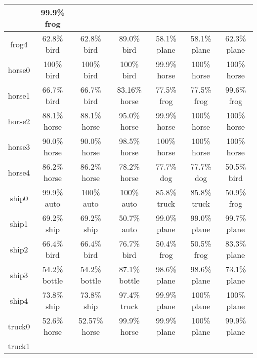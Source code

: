 \begin{longtable}{| c | c | c | c | c | c | c |}
& 99.9\% frog\cellcolor{green}\\
 \hline
frog4 \cellcolor{light-gray}	
& 62.8\% bird		
& 62.8\% bird 	
& 89.0\% bird 	
&  58.1\% plane
& 58.1\% plane
 & 62.3\% plane\\
 \hline
horse0 \cellcolor{light-gray} 	
& 100\% bird		
& 100\% bird 	
& 100\% bird 	
&  99.9\% horse\cellcolor{green}	 
& 100\% horse\cellcolor{green} 	
& 100\% horse\cellcolor{green}\\
 \hline
horse1 \cellcolor{light-gray}	
& 66.7\% bird		
& 66.7\% bird 	
& 83.16\% horse\cellcolor{green} 
&  77.5\% frog	 
& 77.5\% frog 	
& 99.6\% frog\\
 \hline
horse2 \cellcolor{light-gray}	
& 88.1\% horse\cellcolor{green}		
& 88.1\% horse\cellcolor{green} 	
& 95.0\% horse\cellcolor{green} 	
&  99.9\% horse\cellcolor{green}	
 & 100\% horse\cellcolor{green} 	
 & 100\% horse\cellcolor{green}\\
 \hline
horse3 \cellcolor{light-gray}	
& 90.0\% horse\cellcolor{green}		
& 90.0\% horse\cellcolor{green} 	
& 98.5\% horse\cellcolor{green} 	
&  100\% horse\cellcolor{green}	
 & 100\% horse\cellcolor{green} 	
 & 100\% horse\cellcolor{green}\\
 \hline
horse4 \cellcolor{light-gray}	
& 86.2\% horse\cellcolor{green}		
& 86.2\% horse\cellcolor{green} 	
& 78.2\% horse\cellcolor{green} 	
&  77.7\% dog	 
& 77.7\% dog 	
& 50.5\% bird\\
 \hline
ship0 \cellcolor{light-gray}	
& 99.9\% auto		
& 100\% auto 	
& 100\% auto 	
&  85.8\% truck	 
& 85.8\% truck 	
& 50.9\% frog\\
 \hline
ship1 \cellcolor{light-gray}	
& 69.2\% ship\cellcolor{green}		
& 69.2\% ship\cellcolor{green} 	
& 50.7\% auto 	
&  99.0\% plane& 99.0\% plane 	
& 99.7\% plane\\
 \hline
ship2 \cellcolor{light-gray}	
& 66.4\% bird		
& 66.4\% bird 	
& 76.7\% bird 	
&  50.4\% frog	 
 & 50.5\% frog 	
 & 83.3\% plane\\
 \hline
ship3 \cellcolor{light-gray}	
& 54.2\% bottle		
& 54.2\% bottle 	
& 87.1\% bottle 
&  98.6\% plane 
& 98.6\% plane 
& 73.1\% plane\\
 \hline
ship4 \cellcolor{light-gray}	
& 73.8\% ship\cellcolor{green}		
& 73.8\% ship\cellcolor{green} 	
& 97.4\% truck 	
&  99.9\% plane
& 100\% plane 
& 100\% plane\\
 \hline
truck0 \cellcolor{light-gray}	
& 52.6\% horse		
& 52.57\% horse	
& 99.9\% horse 	
&  99.9\% plane& 100\% plane
& 99.9\% plane\\
 \hline
truck1 \cellcolor{light-gray}	

\end{longtable}
